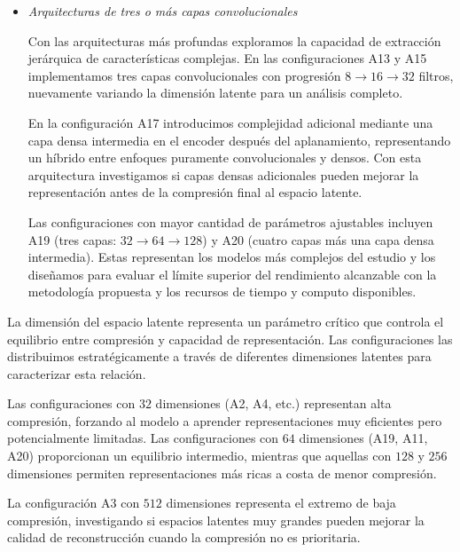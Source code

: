 \begin{itemize}
    \item \emph{Arquitecturas de tres o más capas convolucionales}
    
    Con las arquitecturas más profundas exploramos la capacidad de extracción jerárquica de características complejas. En las configuraciones A13 y A15 implementamos tres capas convolucionales con progresión $8\rightarrow 16\rightarrow 32$ filtros, nuevamente variando la dimensión latente para un análisis completo.
    
    En la configuración A17 introducimos complejidad adicional mediante una capa densa intermedia en el encoder después del aplanamiento, representando un híbrido entre enfoques puramente convolucionales y densos. Con esta arquitectura investigamos si capas densas adicionales pueden mejorar la representación antes de la compresión final al espacio latente.
    
    Las configuraciones con mayor cantidad de parámetros ajustables incluyen A19 (tres capas: $32\rightarrow 64\rightarrow 128$) y A20 (cuatro capas más una capa densa intermedia). Estas representan los modelos más complejos del estudio y los diseñamos para evaluar el límite superior del rendimiento alcanzable con la metodología propuesta y los recursos de tiempo y computo disponibles.

\end{itemize}


La dimensión del espacio latente representa un parámetro crítico que controla el equilibrio entre compresión y capacidad de representación. Las configuraciones las distribuimos estratégicamente a través de diferentes dimensiones latentes para caracterizar esta relación.

Las configuraciones con $32$ dimensiones (A2, A4, etc.) representan alta compresión, forzando al modelo a aprender representaciones muy eficientes pero potencialmente limitadas. Las configuraciones con $64$ dimensiones (A19, A11, A20) proporcionan un equilibrio intermedio, mientras que aquellas con $128$ y $256$ dimensiones permiten representaciones más ricas a costa de menor compresión.

La configuración A3 con $512$ dimensiones representa el extremo de baja compresión, investigando si espacios latentes muy grandes pueden mejorar la calidad de reconstrucción cuando la compresión no es prioritaria.


